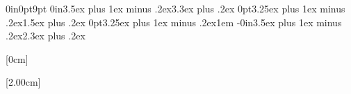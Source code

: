 \titlespacing*{\chapter} {0in}{0pt}{9pt}
\titlespacing*{\section} {0in}{3.5ex plus 1ex minus .2ex}{3.3ex plus .2ex}
\titlespacing*{\subsection} {0pt}{3.25ex plus 1ex minus .2ex}{1.5ex plus .2ex}
\titlespacing*{\paragraph} {0pt}{3.25ex plus 1ex minus .2ex}{1em}
\titlespacing*{\subparagraph} {-0in}{3.5ex plus 1ex minus .2ex}{2.3ex plus .2ex}

\renewcommand{\bottomtitlespace}{2.5in}



\newcommand{\setsection}[2]{%
  \setcounter{chapter}{#1}
  \setcounter{section}{#2}
  \addtocounter{section}{-1}

}





\usepackage{titletoc} %
\contentsmargin{1cm} %


[0cm]
{\addvspace{20pt}\centering\large\bfseries}
{}
{}
{}

[2.00cm] %
{\addvspace{5pt}\large\sffamily\bfseries} %
{} %
{}
{\color{maincolor}\large\;\;\thecontentspage} %

